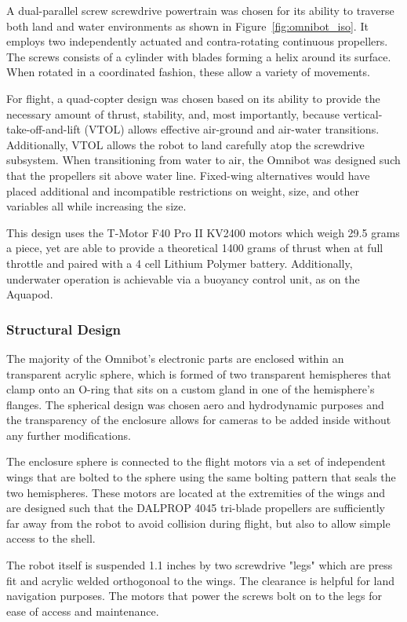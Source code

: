 A dual-parallel screw screwdrive powertrain was chosen for its ability to traverse both land and water environments as shown in Figure~\ref{fig:omnibot_iso}. It employs two independently actuated and contra-rotating continuous propellers. The screws consists of a cylinder with blades forming a helix around its surface. When rotated in a coordinated fashion, these allow a variety of movements. 

For flight, a quad-copter design was chosen based on its ability to provide the necessary amount of thrust, stability, and, most importantly, because vertical-take-off-and-lift (VTOL) allows effective air-ground and air-water transitions. Additionally, VTOL allows the robot to land carefully atop the screwdrive subsystem. When transitioning from water to air, the Omnibot was designed such that the propellers sit above water line. Fixed-wing alternatives would have placed additional and incompatible restrictions on weight, size, and other variables all while increasing the size. 

This design uses the T-Motor F40 Pro II KV2400 motors which weigh 29.5 grams a piece, yet are able to provide a theoretical 1400 grams of thrust when at full throttle and paired with a 4 cell Lithium Polymer battery. Additionally, underwater operation is achievable via a buoyancy control unit, as on the Aquapod. 

\subsubsection{Structural Design}

The majority of the Omnibot's electronic parts are enclosed within an transparent acrylic sphere, which is formed of two transparent hemispheres that clamp onto an O-ring that sits on a custom gland in one of the hemisphere's flanges.  The spherical design was chosen aero and hydrodynamic purposes and the transparency of the enclosure allows for cameras to be added inside without any further modifications.

The enclosure sphere is connected to the flight motors via a set of independent wings that are bolted to the sphere using the same bolting pattern that seals the two hemispheres. These motors are located at the extremities of the wings and are designed such that the DALPROP 4045 tri-blade propellers are sufficiently far away from the robot to avoid collision during flight, but also to allow simple access to the shell. 

The robot itself is suspended 1.1 inches by two screwdrive "legs" which are press fit and acrylic welded orthogonoal to the wings. The clearance is helpful for land navigation purposes. The motors that power the screws bolt on to the legs for ease of access and maintenance. 

